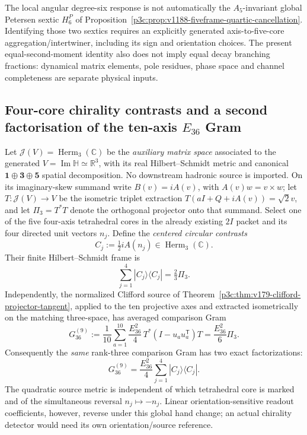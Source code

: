 \documentclass[12pt,a4paper]{article}
\begin{document}
\begin{remark}
\label{p3c:rem:v190-sixfold-owner-frontier}
The local angular degree-six response is not automatically the
$A_5$-invariant global Petersen sextic
$H_6^P$ of Proposition~\ref{p3c:prop:v1188-fiveframe-quartic-cancellation}.
Identifying those two sextics requires an explicitly generated
axis-to-five-core aggregation/intertwiner, including its sign and
orientation choices. The present equal-second-moment identity also
does not imply equal decay branching fractions: dynamical matrix
elements, pole residues, phase space and channel completeness are
separate physical inputs.
\end{remark}


\subsection{Four-core chirality contrasts and a second factorisation of the ten-axis $E_{36}$ Gram}
\label{p3c:subsec:cc12-chiral-gram-factorization}
\begin{corollary}
\label{p3c:cor:cc12-e36-chiral-factorization}
Let $\mathcal J(V)=\operatorname{Herm}_3(\mathbb C)$ be the
\emph{auxiliary matrix space} associated to the generated
$V=\operatorname{Im}\mathbb H\simeq\mathbb R^3$, with its real
Hilbert--Schmidt metric and canonical $\mathbf1\oplus\mathbf3\oplus\mathbf5$
spatial decomposition. No downstream hadronic source is imported.
On its imaginary-skew summand write $B(v)=iA(v)$, with
$A(v)w=v\times w$; let $T:\mathcal J(V)\to V$ be
the isometric triplet extraction $T(aI+Q+iA(v))=\sqrt2v$,
and let $\Pi_3=T^*T$ denote the orthogonal projector
onto that summand. Select one of the five four-axis tetrahedral cores
in the already existing $2I$ packet and its four directed unit
vectors $n_j$. Define the \emph{centered circular contrasts}
\[
 C_j:=\tfrac12iA(n_j)\in\operatorname{Herm}_3(\mathbb C).
\]
Their finite Hilbert--Schmidt frame is
\[
 \boxed{\sum_{j=1}^4 |C_j\rangle\langle C_j|
       =\tfrac23\Pi_3.}
\]
Independently, the normalized Clifford source of
Theorem~\ref{p3c:thm:v179-clifford-projector-tangent}, applied
to the ten projective axes and extracted isometrically on the
matching three-space, has averaged comparison Gram
\[
 G^{(9)}_{36}:=\frac1{10}\sum_{a=1}^{10}
  \frac{E_{36}^2}{4}\,T^*(I-u_au_a^{\mathsf T})T
  =\frac{E_{36}^2}{6}\Pi_3.
\] Consequently the \emph{same} rank-three
comparison Gram has two exact factorizations:
\[
 \boxed{G^{(9)}_{36}=\frac{E_{36}^2}{4}
  \sum_{j=1}^4|C_j\rangle\langle C_j|.}
\]
The quadratic source metric is independent of which tetrahedral core
is marked and of the simultaneous reversal $n_j\mapsto-n_j$.
Linear orientation-sensitive readout coefficients, however, reverse
under this global hand change; an actual chirality detector would
need its own orientation/source reference.
\end{corollary}
\end{document}
